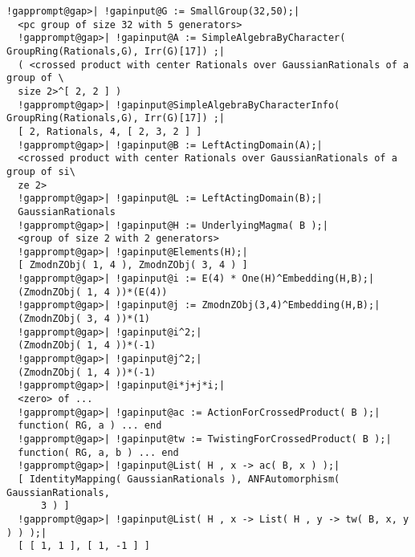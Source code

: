 \documentclass[a4paper,11pt]{report}
\begin{document}
{{{\begin{Verbatim}[commandchars=!@|,fontsize=\small,frame=single,label=Example]
  !gapprompt@gap>| !gapinput@G := SmallGroup(32,50);|
  <pc group of size 32 with 5 generators>
  !gapprompt@gap>| !gapinput@A := SimpleAlgebraByCharacter( GroupRing(Rationals,G), Irr(G)[17]) ;|
  ( <crossed product with center Rationals over GaussianRationals of a group of \
  size 2>^[ 2, 2 ] )
  !gapprompt@gap>| !gapinput@SimpleAlgebraByCharacterInfo( GroupRing(Rationals,G), Irr(G)[17]) ;|
  [ 2, Rationals, 4, [ 2, 3, 2 ] ]
  !gapprompt@gap>| !gapinput@B := LeftActingDomain(A);|
  <crossed product with center Rationals over GaussianRationals of a group of si\
  ze 2>
  !gapprompt@gap>| !gapinput@L := LeftActingDomain(B);|
  GaussianRationals
  !gapprompt@gap>| !gapinput@H := UnderlyingMagma( B );|
  <group of size 2 with 2 generators>
  !gapprompt@gap>| !gapinput@Elements(H);|
  [ ZmodnZObj( 1, 4 ), ZmodnZObj( 3, 4 ) ]
  !gapprompt@gap>| !gapinput@i := E(4) * One(H)^Embedding(H,B);|
  (ZmodnZObj( 1, 4 ))*(E(4))
  !gapprompt@gap>| !gapinput@j := ZmodnZObj(3,4)^Embedding(H,B);|
  (ZmodnZObj( 3, 4 ))*(1)
  !gapprompt@gap>| !gapinput@i^2;|
  (ZmodnZObj( 1, 4 ))*(-1)
  !gapprompt@gap>| !gapinput@j^2;|
  (ZmodnZObj( 1, 4 ))*(-1)
  !gapprompt@gap>| !gapinput@i*j+j*i;|
  <zero> of ...
  !gapprompt@gap>| !gapinput@ac := ActionForCrossedProduct( B );|
  function( RG, a ) ... end
  !gapprompt@gap>| !gapinput@tw := TwistingForCrossedProduct( B );|
  function( RG, a, b ) ... end
  !gapprompt@gap>| !gapinput@List( H , x -> ac( B, x ) );|
  [ IdentityMapping( GaussianRationals ), ANFAutomorphism( GaussianRationals,
      3 ) ]
  !gapprompt@gap>| !gapinput@List( H , x -> List( H , y -> tw( B, x, y ) ) );|
  [ [ 1, 1 ], [ 1, -1 ] ]
  
\end{Verbatim}
 
\begin{Verbatim}[commandchars=!@|,fontsize=\small,frame=single,label=Example]
  

\end{Verbatim}}}}
\end{document}
